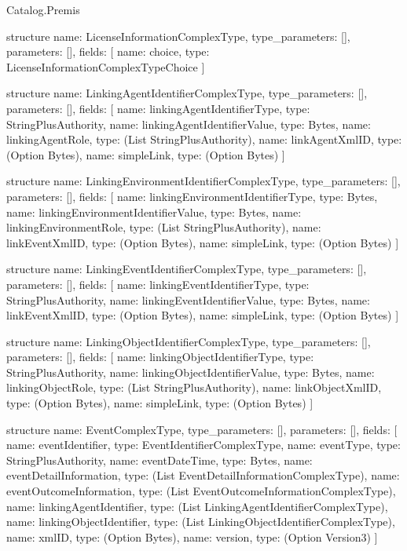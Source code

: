 \begin{lexlean}{Catalog.Premis}
\begin{semanticmodule}
structure{
  name: LicenseInformationComplexType,
  type_parameters: [],
  parameters: [],
  fields: [
    {name: choice, type: LicenseInformationComplexTypeChoice}
  ]
}

structure{
  name: LinkingAgentIdentifierComplexType,
  type_parameters: [],
  parameters: [],
  fields: [
    {name: linkingAgentIdentifierType, type: StringPlusAuthority},
    {name: linkingAgentIdentifierValue, type: Bytes},
    {name: linkingAgentRole, type: (List StringPlusAuthority)},
    {name: linkAgentXmlID, type: (Option Bytes)},
    {name: simpleLink, type: (Option Bytes)}
  ]
}

structure{
  name: LinkingEnvironmentIdentifierComplexType,
  type_parameters: [],
  parameters: [],
  fields: [
    {name: linkingEnvironmentIdentifierType, type: Bytes},
    {name: linkingEnvironmentIdentifierValue, type: Bytes},
    {name: linkingEnvironmentRole, type: (List StringPlusAuthority)},
    {name: linkEventXmlID, type: (Option Bytes)},
    {name: simpleLink, type: (Option Bytes)}
  ]
}

structure{
  name: LinkingEventIdentifierComplexType,
  type_parameters: [],
  parameters: [],
  fields: [
    {name: linkingEventIdentifierType, type: StringPlusAuthority},
    {name: linkingEventIdentifierValue, type: Bytes},
    {name: linkEventXmlID, type: (Option Bytes)},
    {name: simpleLink, type: (Option Bytes)}
  ]
}

structure{
  name: LinkingObjectIdentifierComplexType,
  type_parameters: [],
  parameters: [],
  fields: [
    {name: linkingObjectIdentifierType, type: StringPlusAuthority},
    {name: linkingObjectIdentifierValue, type: Bytes},
    {name: linkingObjectRole, type: (List StringPlusAuthority)},
    {name: linkObjectXmlID, type: (Option Bytes)},
    {name: simpleLink, type: (Option Bytes)}
  ]
}

structure{
  name: EventComplexType,
  type_parameters: [],
  parameters: [],
  fields: [
    {name: eventIdentifier, type: EventIdentifierComplexType},
    {name: eventType, type: StringPlusAuthority},
    {name: eventDateTime, type: Bytes},
    {name: eventDetailInformation, type: (List EventDetailInformationComplexType)},
    {name: eventOutcomeInformation, type: (List EventOutcomeInformationComplexType)},
    {name: linkingAgentIdentifier, type: (List LinkingAgentIdentifierComplexType)},
    {name: linkingObjectIdentifier, type: (List LinkingObjectIdentifierComplexType)},
    {name: xmlID, type: (Option Bytes)},
    {name: version, type: (Option Version3)}
  ]
}


\end{semanticmodule}
\end{lexlean}

